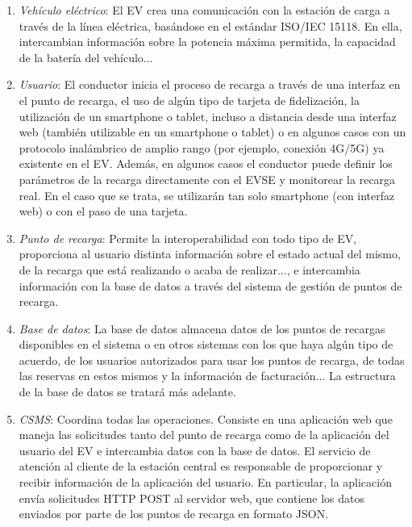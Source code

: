 \documentclass[12pt,a4paper,onecolumn,oneside]{report}
\begin{document}
\begin{enumerate}

\item \textit{Vehículo eléctrico}: El EV crea una comunicación con la estación de carga a través de la línea eléctrica, basándose en el estándar ISO/IEC 15118. En ella, intercambian información sobre la potencia máxima permitida, la capacidad de la batería del vehículo...

\item \textit{Usuario}: El conductor inicia el proceso de recarga a través de una interfaz en el punto de recarga, el uso de algún tipo de tarjeta de fidelización, la utilización de un smartphone o tablet, incluso a distancia desde una interfaz web (también utilizable en un smartphone o tablet) o en algunos casos con un protocolo inalámbrico de amplio rango (por ejemplo, conexión 4G/5G) ya existente en el EV. Además, en algunos casos el conductor puede definir los parámetros de la recarga directamente con el EVSE y monitorear la recarga real. En el caso que se trata, se utilizarán tan solo smartphone (con interfaz web) o con el paso de una tarjeta.

\item \textit{Punto de recarga}: Permite la interoperabilidad con todo tipo de EV, proporciona al usuario distinta información sobre el estado actual del mismo, de la recarga que está realizando o acaba de realizar..., e intercambia información con la base de datos a través del sistema de gestión de puntos de recarga.

\item \textit{Base de datos}: La base de datos almacena datos de los puntos de recargas disponibles en el sistema o en otros sistemas con los que haya algún tipo de acuerdo, de los usuarios autorizados para usar los puntos de recarga, de todas las reservas en estos mismos y la información de facturación... La estructura de la base de datos se tratará más adelante.

\item \textit{CSMS}: Coordina todas las operaciones. Consiste en una aplicación web que maneja las solicitudes tanto del punto de recarga como de la aplicación del usuario del EV e intercambia datos con la base de datos.  El servicio de atención al cliente de la estación central es responsable de proporcionar y recibir información de la aplicación del usuario. En particular, la aplicación envía solicitudes HTTP POST al servidor web, que contiene los datos enviados por parte de los puntos de recarga en formato JSON.

\end{enumerate}
\end{document}
